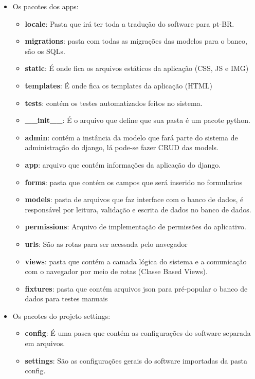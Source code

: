 \begin{itemize}
  \item Os pacotes dos apps:
  \begin{itemize}
    \item \textbf{locale}: Pasta que irá ter toda a tradução do software para pt-BR.
    \item \textbf{migrations}: pasta com todas as migrações das modelos para o banco, são os SQLs.
    \item \textbf{static}: É onde fica os arquivos estáticos da aplicação (CSS, JS e IMG)
    \item \textbf{templates}: É onde fica os templates da aplicação (HTML)
    \item \textbf{tests}: contém os testes automatizados feitos no sistema.
    \item \textbf{\_\_init\_\_}: É o arquivo que define que sua pasta é um pacote python.
    \item \textbf{admin}: contém a instância da modelo que fará parte do sistema de administração do django, lá pode-se
      fazer CRUD das models.
    \item \textbf{app}: arquivo que contém informações da aplicação do django.
    \item \textbf{forms}: pasta que contém os campos que será inserido no formularios
    \item \textbf{models}: pasta de arquivos que faz interface com o banco de dados, é responsável por leitura,
      validação e escrita de dados no banco de dados.
    \item \textbf{permissions}: Arquivo de implementação de permissões do aplicativo.
    \item \textbf{urls}: São as rotas para ser acessada pelo navegador
    \item \textbf{views}: pasta que contém a camada lógica do sistema e a comunicação com o navegador por meio de
      rotas (Classe Based Views).
    \item \textbf{fixtures}: pasta que contém arquivos json para pré-popular o banco de dados para testes manuais
  \end{itemize}
  \item Os pacotes do projeto settings:
  \begin{itemize}
    \item \textbf{config}: É uma pasca que contém as configurações do software separada em arquivos.
    \item \textbf{settings}: São as configurações gerais do software importadas da pasta config.

\end{itemize}
\end{itemize}
